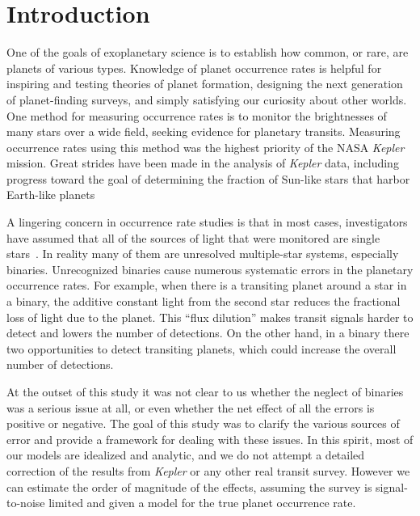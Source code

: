 \documentclass[12pt,modern]{aastex61}
\begin{document}
\section{Introduction}

One of the goals of exoplanetary science is to establish how common,
or rare, are planets of various types.  Knowledge of planet occurrence
rates is helpful for inspiring and testing theories of planet
formation, designing the next generation of planet-finding surveys,
and simply satisfying our curiosity about other worlds.  One method
for measuring occurrence rates is to monitor the brightnesses of many
stars over a wide field, seeking evidence for planetary transits.
Measuring occurrence rates using this method was the highest priority
of the NASA {\it Kepler} mission.  Great strides have been made in the
analysis of {\it Kepler} data, including progress toward the goal of
determining the fraction of Sun-like stars that harbor Earth-like
planets~\citep{
  youdin_exoplanet_2011,petigura_prevalence_2013,dong_fast_2013,
  foreman-mackey_exoplanet_2014,burke_terrestrial_2015}

A lingering concern in occurrence rate studies is that in most cases,
investigators have assumed that all of the sources of light that were
monitored are single stars~\citep[\textit{e.g.},][]{
  howard_planet_2012,fressin_false_2013,foreman-mackey_exoplanet_2014,
  dressing_occurrence_2015,burke_terrestrial_2015}. In reality many of
them are unresolved multiple-star systems, especially binaries.
Unrecognized binaries cause numerous systematic errors in the
planetary occurrence rates.  For example, when there is a transiting
planet around a star in a binary, the additive constant light from the
second star reduces the fractional loss of light due to the planet.
This ``flux dilution'' makes transit signals harder to detect and
lowers the number of detections.  On the other hand, in a binary there
two opportunities to detect transiting planets, which could increase
the overall number of detections.

At the outset of this study it was not clear to us whether the neglect
of binaries was a serious issue at all, or even whether the net effect
of all the errors is positive or negative.  The goal of this study was
to clarify the various sources of error and provide a framework for
dealing with these issues.  In this spirit, most of our models are
idealized and analytic, and we do not attempt a detailed correction of
the results from {\it Kepler} or any other real transit survey.
However we can estimate the order of magnitude of the effects,
assuming the survey is signal-to-noise limited and given a model for
the true planet occurrence rate.
\end{document}
